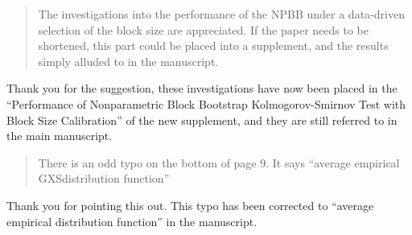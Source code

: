 \documentclass[12pt]{article}
\newenvironment{comment}%
{\begin{quotation}\noindent\small\it\color{darkblue}\ignorespaces%
}{\end{quotation}}
\begin{document}
\begin{comment}
The investigations into the performance of the NPBB under a
data-driven selection of the block size are appreciated.  If the paper
needs to be shortened, this part could be placed into a supplement,
and the results simply alluded to in the manuscript.
\end{comment}

Thank you for the suggestion, these investigations have now been
placed in the ``Performance of Nonparametric Block Bootstrap
Kolmogorov-Smirnov Test with Block Size Calibration'' of the new
supplement, and they are still referred to in the main manuscript.

\begin{comment}
There is an odd typo on the bottom of page 9. It says ``average
empirical GXSdistribution function''
\end{comment}

Thank you for pointing this out. This typo has been
corrected to ``average empirical distribution function'' in the manuscript.





\end{document}
